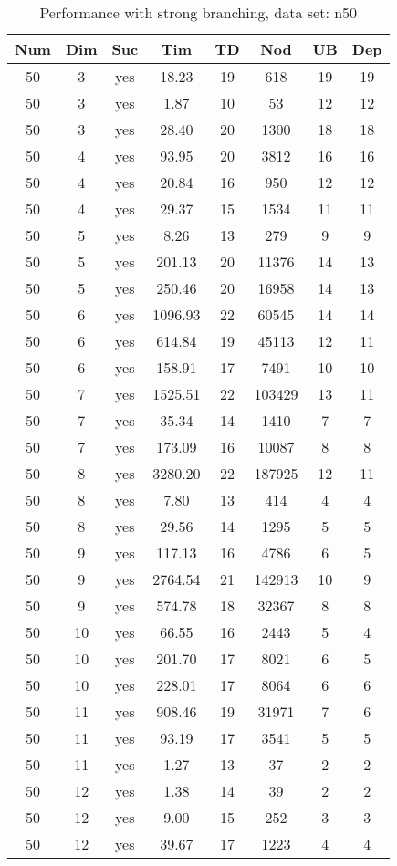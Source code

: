 \begin{table}[!htb]
  \centering
  \begin{tabular}[center]{|c|c|c|c|c|c|c|c|}
    \hline
    Num & Dim & Suc & Tim & TD & Nod & UB & Dep \\
    \hline
    50 & 3 & yes & 18.23 & 19 & 618 & 19 & 19 \\
    50 & 3 & yes & 1.87 & 10 & 53 & 12 & 12 \\
    50 & 3 & yes & 28.40 & 20 & 1300 & 18 & 18 \\
    50 & 4 & yes & 93.95 & 20 & 3812 & 16 & 16 \\
    50 & 4 & yes & 20.84 & 16 & 950 & 12 & 12 \\
    50 & 4 & yes & 29.37 & 15 & 1534 & 11 & 11 \\
    50 & 5 & yes & 8.26 & 13 & 279 & 9 & 9 \\
    50 & 5 & yes & 201.13 & 20 & 11376 & 14 & 13 \\
    50 & 5 & yes & 250.46 & 20 & 16958 & 14 & 13 \\
    50 & 6 & yes & 1096.93 & 22 & 60545 & 14 & 14 \\
    50 & 6 & yes & 614.84 & 19 & 45113 & 12 & 11 \\
    50 & 6 & yes & 158.91 & 17 & 7491 & 10 & 10 \\
    50 & 7 & yes & 1525.51 & 22 & 103429 & 13 & 11 \\
    50 & 7 & yes & 35.34 & 14 & 1410 & 7 & 7 \\
    50 & 7 & yes & 173.09 & 16 & 10087 & 8 & 8 \\
    50 & 8 & yes & 3280.20 & 22 & 187925 & 12 & 11 \\
    50 & 8 & yes & 7.80 & 13 & 414 & 4 & 4 \\
    50 & 8 & yes & 29.56 & 14 & 1295 & 5 & 5 \\
    50 & 9 & yes & 117.13 & 16 & 4786 & 6 & 5 \\
    50 & 9 & yes & 2764.54 & 21 & 142913 & 10 & 9 \\
    50 & 9 & yes & 574.78 & 18 & 32367 & 8 & 8 \\
    50 & 10 & yes & 66.55 & 16 & 2443 & 5 & 4 \\
    50 & 10 & yes & 201.70 & 17 & 8021 & 6 & 5 \\
    50 & 10 & yes & 228.01 & 17 & 8064 & 6 & 6 \\
    50 & 11 & yes & 908.46 & 19 & 31971 & 7 & 6 \\
    50 & 11 & yes & 93.19 & 17 & 3541 & 5 & 5 \\
    50 & 11 & yes & 1.27 & 13 & 37 & 2 & 2 \\
    50 & 12 & yes & 1.38 & 14 & 39 & 2 & 2 \\
    50 & 12 & yes & 9.00 & 15 & 252 & 3 & 3 \\
    50 & 12 & yes & 39.67 & 17 & 1223 & 4 & 4 \\
    \hline
  \end{tabular}
  \caption{Performance with strong branching, data set: n50}
  \label{tab:test.bran-n50}
\end{table}

